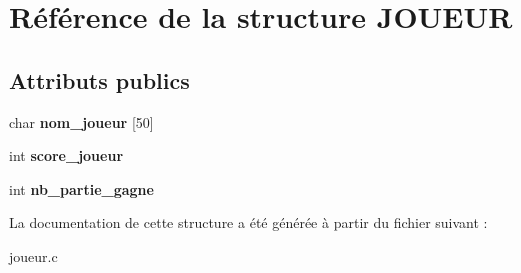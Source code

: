 \hypertarget{structJOUEUR}{}\section{Référence de la structure J\+O\+U\+E\+UR}
\label{structJOUEUR}
\subsection*{Attributs publics}
\begin{DoxyCompactItemize}
\item 
char {\bfseries nom\+\_\+joueur} \mbox{[}50\mbox{]}\hypertarget{structJOUEUR_a6e3438385c0b28f03b09ef1cddb95856}{}\label{structJOUEUR_a6e3438385c0b28f03b09ef1cddb95856}

\item 
int {\bfseries score\+\_\+joueur}\hypertarget{structJOUEUR_a035fef6f10ff7ba3dd84b0d54b5a3c6d}{}\label{structJOUEUR_a035fef6f10ff7ba3dd84b0d54b5a3c6d}

\item 
int {\bfseries nb\+\_\+partie\+\_\+gagne}\hypertarget{structJOUEUR_af09bad4b5e74a1899220e67415a95bf7}{}\label{structJOUEUR_af09bad4b5e74a1899220e67415a95bf7}

\end{DoxyCompactItemize}


La documentation de cette structure a été générée à partir du fichier suivant \+:\begin{DoxyCompactItemize}
\item 
joueur.\+c\end{DoxyCompactItemize}
